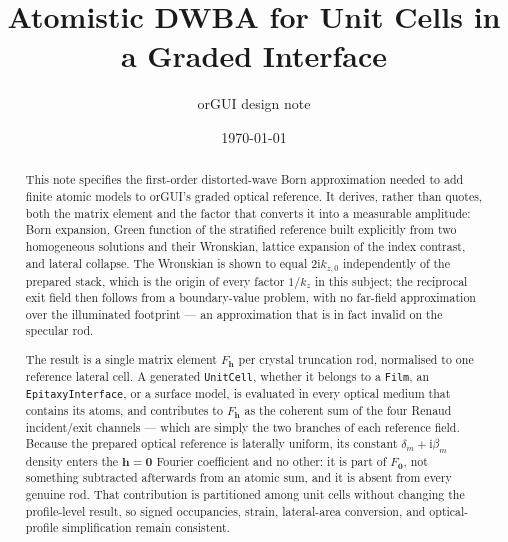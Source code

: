 \documentclass[11pt]{report}
\title{Atomistic DWBA for Unit Cells in a Graded Interface}
\author{orGUI design note}
\date{\today}
\newcommand{\ii}{\mathrm{i}}
\begin{document}
\hypersetup{pageanchor=false}
\maketitle

\begin{abstract}
This note specifies the first-order distorted-wave Born approximation needed
to add finite atomic models to orGUI's graded optical reference.  It derives,
rather than quotes, both the matrix element and the factor that converts it
into a measurable amplitude: Born expansion, Green function of the stratified
reference built explicitly from two homogeneous solutions and their Wronskian,
lattice expansion of the index contrast, and lateral collapse.  The Wronskian
is shown to equal $2\ii k_{z,0}$ independently of the prepared stack, which is
the origin of every factor $1/k_z$ in this subject; the reciprocal exit field
then follows from a boundary-value problem, with no far-field approximation
over the illuminated footprint --- an approximation that is in fact invalid on
the specular rod.

The result is a single matrix element $F_{\bm h}$ per crystal truncation rod,
normalised to one reference lateral cell.  A generated \texttt{UnitCell},
whether it belongs to a \texttt{Film}, an \texttt{EpitaxyInterface}, or a
surface model, is evaluated in every optical medium that contains its atoms,
and contributes to $F_{\bm h}$ as the coherent sum of the four Renaud
incident/exit channels --- which are simply the two branches of each reference
field.  Because the prepared optical reference is laterally uniform, its
constant $\delta_m+\ii\beta_m$ density enters the $\bm h=\bm 0$ Fourier
coefficient and no other: it is part of $F_{\bm 0}$, not something subtracted
afterwards from an atomic sum, and it is absent from every genuine rod.  That
contribution is partitioned among unit cells without changing the
profile-level result, so signed occupancies, strain, lateral-area conversion,
and optical-profile simplification remain consistent.
\end{abstract}

\tableofcontents
\clearpage
\hypersetup{pageanchor=true}






\end{document}
